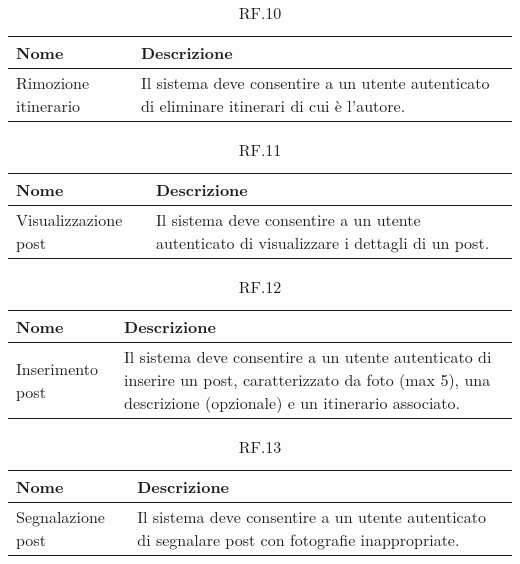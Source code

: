 \documentclass{natourDoc}
\begin{document}
	\begin{table}[H]
		\centering
		\begin{tabular}{ |p{5cm}|p{10.3cm}| }
			\hline
			\rowcolor{PineGreen!70}
			\textbf{Nome} & \textbf{Descrizione} \\
			\hline
			Rimozione itinerario & Il sistema deve consentire a un utente autenticato di eliminare itinerari di cui
			è l'autore. \\
			\hline
		\end{tabular}
		\caption{RF.10}
		\label{table:10}
	\end{table}
	
	\begin{table}[H]
		\centering
		\begin{tabular}{ |p{5cm}|p{10.3cm}| }
			\hline
			\rowcolor{PineGreen!70}
			\textbf{Nome} & \textbf{Descrizione} \\
			\hline
			Visualizzazione post & Il sistema deve consentire a un utente autenticato di visualizzare
			i dettagli di un post. \\
			\hline
		\end{tabular}
		\caption{RF.11}
		\label{table:11}
	\end{table}

	\begin{table}[H]
		\centering
		\begin{tabular}{ |p{5cm}|p{10.3cm}| } 
			\hline
			\rowcolor{PineGreen!70}
			\textbf{Nome} & \textbf{Descrizione} \\
			\hline
			Inserimento post &  Il sistema deve consentire a un utente autenticato di inserire un post, 
			caratterizzato da foto (max 5), una descrizione (opzionale) e un itinerario associato. \\
			\hline
		\end{tabular}
		\caption{RF.12}
		\label{table:12}
	\end{table}
	
	
	\begin{table}[H]
		\centering
		\begin{tabular}{ |p{5cm}|p{10.3cm}| }
			\hline
			\rowcolor{PineGreen!70}
			\textbf{Nome} & \textbf{Descrizione} \\
			\hline
			Segnalazione post & Il sistema deve consentire a un utente autenticato di segnalare post con fotografie
			inappropriate. \\
			\hline
		\end{tabular}
		\caption{RF.13}
		\label{table:13}
	\end{table}
\end{document}
